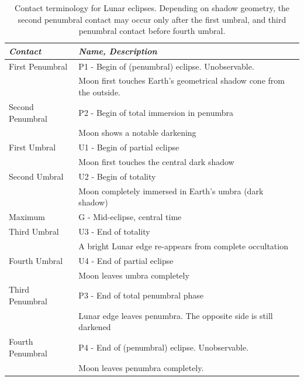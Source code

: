 \begin{table}[p]
  \centering\small
  \begin{tabular}{ll}
\toprule
\emph{Contact} & \emph{Name, Description}\\\midrule
First  Penumbral & P1 - Begin of (penumbral) eclipse. Unobservable. \\
                 & Moon first touches Earth's geometrical shadow cone from the outside. \\  
Second Penumbral & P2 - Begin of total immersion in penumbra\\
                 & Moon shows a notable darkening \\  
First  Umbral    & U1 - Begin of partial eclipse\\
                 & Moon first touches the central dark shadow \\  
Second Umbral    & U2 - Begin of totality\\
                 & Moon completely immersed in Earth's umbra (dark shadow) \\  
Maximum          & G - Mid-eclipse, central time\\
Third  Umbral    & U3 - End of totality\\
                 & A bright Lunar edge re-appears from complete occultation \\  
Fourth Umbral    & U4 - End of partial eclipse\\
                 & Moon leaves umbra completely \\  
Third  Penumbral & P3 - End of total penumbral phase\\
                 & Lunar edge leaves penumbra. The opposite side is still darkened\\  
Fourth Penumbral & P4 - End of (penumbral) eclipse. Unobservable. \\
                 & Moon leaves penumbra completely. \\  
\bottomrule
\end{tabular}
\caption{Contact terminology for Lunar eclipses. Depending on shadow
  geometry, the second penumbral contact may occur only after the first
  umbral, and third penumbral contact before fourth umbral.}
\label{tab:Eclipses:ContactTimesLunar}
\end{table}


